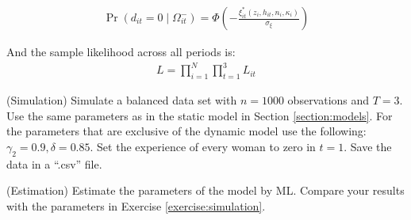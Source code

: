 \begin{eqnarray*}
\Pr \left(d_{it} = 0 \middle| \Omega_{it}^- \right) = \Phi\left(- \frac{\xi_{it}^* \left(z_i, h_{it}, n_i, \kappa_i \right)}{\sigma_\xi} \right)
\end{eqnarray*}

\noindent And the sample likelihood across all periods is:
\begin{eqnarray*}
L = \prod_{i=1}^N \prod_{t=1}^3 L_{it}
\end{eqnarray*}

\begin{exercise} (Simulation) \label{exercise:simulation}
Simulate a balanced data set with $n = 1000$ observations and $T=3$. Use the same parameters as in the static model in Section \ref{section:models}. For the parameters that are exclusive of the dynamic model use the following: $\gamma_2 = 0.9,\delta = 0.85$. Set the experience of every woman to zero in $t=1$. Save the data in a ``.csv'' file.
\end{exercise}

\begin{exercise} (Estimation)
Estimate the parameters of the model by ML. Compare your results with the parameters in Exercise \ref{exercise:simulation}.
\end{exercise} 